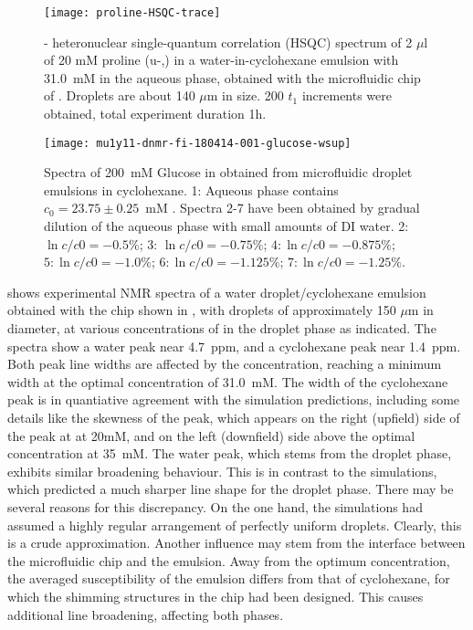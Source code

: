 \begin{figure}
  \begin{center}
    \texttt{[image: proline-HSQC-trace]}
  \end{center}
  \caption{- heteronuclear single-quantum correlation (HSQC) spectrum of 2 $\mu$l
  of 20 mM proline (u-,) in
    a water-in-cyclohexane emulsion with 31.0~mM  in the aqueous phase,
    obtained with the microfluidic chip of .
    Droplets are about 140 $\mu$m in size. 200 $t_1$ increments were obtained,
    total experiment duration 1h.}
    \label{fig:proline-HSQC}
\end{figure}




\begin{figure}
\begin{center}
	\texttt{[image: mu1y11-dnmr-fi-180414-001-glucose-wsup]}
\end{center}
\caption{Spectra of 200~mM Glucose in  obtained from microfluidic droplet emulsions in
	cyclohexane. 1: Aqueous phase contains $c_0=23.75\pm0.25$~mM . Spectra 2-7
	have been obtained by gradual dilution of the aqueous phase with small amounts of DI water.
	2: $\ln c/c0 = -0.5\%$; 3: $\ln c/c0 = -0.75\%$; $4: \ln c/c0 = -0.875\%$;
	$5: \ln c/c0 = -1.0\%$; $6: \ln c/c0 = -1.125\%$; $7: \ln c/c0 = -1.25\%$.}
\label{fig:glucose-dilution}
\end{figure}


 shows experimental  NMR spectra of
a water droplet/cyclo\-hexane emulsion obtained with the chip shown in
, with droplets of approximately 150 $\mu$m in diameter,
at various concentrations of  in the droplet phase as
indicated. The spectra show a water peak near 4.7~ppm, and a
cyclohexane peak near 1.4~ppm. Both peak line widths are affected by the
 concentration, reaching a minimum width at the optimal
concentration of 31.0~mM. The width of the cyclohexane peak is in quantiative
agreement with the simulation predictions, including some details like
the skewness of the peak, which appears on the right (upfield) side
of the peak at at 20mM, and on the left (downfield) side above
the optimal concentration at 35~mM. The water peak, which
stems from the droplet phase, exhibits similar broadening behaviour. This
is in contrast to the simulations, which predicted a much sharper line shape
for the droplet phase. There may be several reasons for this discrepancy.
On the one hand, the simulations had assumed a highly regular arrangement
of perfectly uniform droplets. Clearly, this is a crude approximation.
Another influence may stem from the interface between the microfluidic chip
and the emulsion. Away from the optimum  concentration, the
averaged susceptibility of the emulsion differs from that of cyclohexane,
for which the shimming structures in the chip had been designed. This
causes additional line broadening, affecting both phases.

